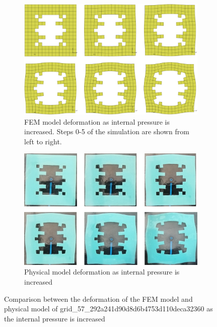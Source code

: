 \begin{figure}[H]
	\centering
	\begin{subfigure}[c]{\textwidth}
		\centering
		\includegraphics[width=\textwidth]{unit2deffem.png}
		\caption{FEM model deformation as internal pressure is increased. Steps 0-5 of the simulation are shown from left to right.}
	\end{subfigure}
	\hfill
	\begin{subfigure}[c]{\textwidth}
		\centering
		\includegraphics[width=\textwidth]{unit2defmod.png}
		\caption{Physical model deformation as internal pressure is increased}
	\end{subfigure}
	\caption[Comparison between FEM and physical models of unit 2]{Comparison between the deformation of the FEM model and physical model of grid\_57\_292a241d90d8d6b4753d110deca32360 as the internal pressure is increased}
	\label{fig:unit2def}
\end{figure}

